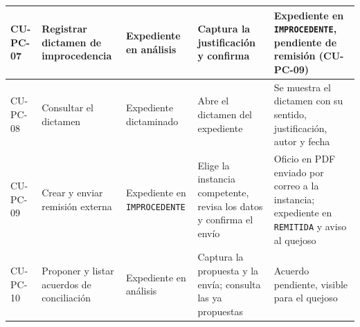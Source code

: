 \begin{longtable}{|p{1.5cm}|p{2.8cm}|p{2.6cm}|p{3.4cm}|p{3.4cm}|}
		CU-PC-07 & Registrar dictamen de improcedencia & Expediente en análisis & Captura la
		justificación y confirma & Expediente en \texttt{IMPROCEDENTE}, pendiente de remisión
		(CU-PC-09) \\ \hline

		CU-PC-08 & Consultar el dictamen & Expediente dictaminado & Abre el dictamen del expediente &
		Se muestra el dictamen con su sentido, justificación, autor y fecha \\ \hline

		CU-PC-09 & Crear y enviar remisión externa & Expediente en \texttt{IMPROCEDENTE} & Elige la
		instancia competente, revisa los datos y confirma el envío & Oficio en PDF enviado por correo
		a la instancia; expediente en \texttt{REMITIDA} y aviso al quejoso \\ \hline

		CU-PC-10 & Proponer y listar acuerdos de conciliación & Expediente en análisis & Captura la
		propuesta y la envía; consulta las ya propuestas & Acuerdo pendiente, visible para el quejoso
		\\ \hline
	\end{longtable}

